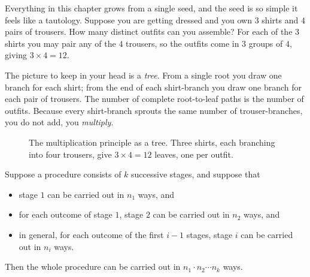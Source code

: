 Everything in this chapter grows from a single seed, and the seed is so simple it feels
like a tautology. Suppose you are getting dressed and you own $3$ shirts and $4$ pairs of
trousers. How many distinct outfits can you assemble? For each of the $3$ shirts you may
pair any of the $4$ trousers, so the outfits come in $3$ groups of $4$, giving $3 \times 4 = 12$.

\begin{intuitionbox}
The picture to keep in your head is a \emph{tree}. From a single root you draw one branch
for each shirt; from the end of each shirt-branch you draw one branch for each pair of
trousers. The number of complete root-to-leaf paths is the number of outfits. Because
every shirt-branch sprouts the same number of trouser-branches, you do not add, you
\emph{multiply}.
\end{intuitionbox}

\begin{figure}[H]
\centering
{}
\caption{The multiplication principle as a tree. Three shirts, each branching into four
trousers, give $3 \times 4 = 12$ leaves, one per outfit.}
\label{ch2:fig-tree}
\end{figure}

\begin{theorem}
\label{ch2:thm-mult}
Suppose a procedure consists of $k$ successive stages, and suppose that
\begin{itemize}
  \item stage $1$ can be carried out in $n_1$ ways, and
  \item for each outcome of stage $1$, stage $2$ can be carried out in $n_2$ ways, and
  \item in general, for each outcome of the first $i-1$ stages, stage $i$ can be carried
        out in $n_i$ ways.
\end{itemize}
Then the whole procedure can be carried out in $n_1 \cdot n_2 \cdots n_k$ ways.
\end{theorem}


